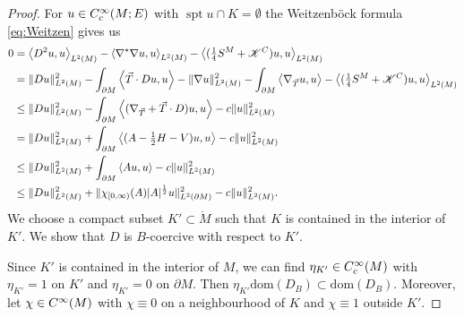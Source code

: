 \documentclass[a4paper,10pt,reqno]{amsart}
\newcommand{\interior}[1]{\mathring{#1}}
\newcommand{\Lp}[2][{}]{{\rm L}^{#2}_{\rm #1}}%
\newcommand{\Ck}[2][{}]{{\rm C}^{#2}_{\rm #1}}%
\newcommand{\dom}{\mathrm{dom}}
\newcommand{\KK}{\mathscr{K}}
\DeclareMathOperator{\spt}{spt}%
\newcommand{\inprod}[1]{\left\langle #1 \right\rangle}%
\newcommand{\dM}{\partial M}
\theoremstyle{definition}
\begin{document}
\begin{proof}
For $u\in \Ck[c]{\infty}(M;E)$ with $\spt u \cap K = \emptyset$ the Weitzenböck formula \eqref{eq:Weitzen} gives us
\begin{align}
0 & =
\inprod{D^2 u, u}_{\Lp{2}(M)} - \inprod{\nabla^*\nabla u, u}_{\Lp{2}(M)} - \inprod{(\tfrac14 S^M + \KK^C) u, u}_{\Lp{2}(M)} \notag \\
  & =
\|Du\|_{\Lp{2}(M)}^2 - \int_{\dM}\inprod{\vec{T}\cdot Du,u}
- \|\nabla u\|_{\Lp{2}(M)}^2 - \int_{\dM}\inprod{\nabla_{\vec{T}}u,u}                                                        
- \inprod{(\tfrac14 S^M + \KK^C) u, u}_{\Lp{2}(M)} \notag                                                                    \\
  & \le
\|Du\|_{\Lp{2}(M)}^2 - \int_{\dM}\inprod{(\nabla_{\vec{T}}+\vec{T}\cdot D)u,u} - c\|u\|_{\Lp{2}(M)}^2 \notag                         \\
  & =
\|Du\|_{\Lp{2}(M)}^2 + \int_{\dM}\inprod{(A-\tfrac12 H-V)u,u} - c\|u\|_{\Lp{2}(M)}^2 \notag                                            \\
  & \le
\|Du\|_{\Lp{2}(M)}^2 + \int_{\dM}\inprod{Au,u} - c\|u\|_{\Lp{2}(M)}^2 \notag                                                         \\
  & \le
\|Du\|_{\Lp{2}(M)}^2 + \|\chi_{[0,\infty)}(A)|A|^{\frac12}u\|_{\Lp{2}(\dM)}^2 - c\|u\|_{\Lp{2}(M)}^2 .
\label{eq:DiracCoerc}
\end{align}
We choose a compact subset $K'\subset \interior{M}$ such that $K$ is contained in the interior of $K'$.
We show that $D$ is $B$-coercive with respect to $K'$.

Since $K'$ is contained in the interior of $M$, we can find $\eta_{K'}\in\Ck[c]{\infty}(M)$ with $\eta_{K'}=1$ on $K'$ and $\eta_{K'}=0$ on $\dM$.
Then $\eta_{K'}\dom(D_B)\subset\dom(D_B)$.
Moreover, let $\chi\in\Ck{\infty}(M)$ with $\chi\equiv 0$ on a neighbourhood of $K$ and $\chi\equiv 1$ outside $K'$.


\end{proof}
\end{document}
